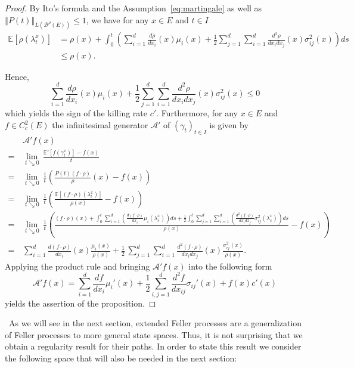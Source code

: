 \documentclass[a4paper,12pt]{article}
\theoremstyle{definition}
\theoremstyle{remark}
\numberwithin{equation}{section}
\numberwithin{theorem}{section}
\begin{document}
\begin{proof}
By Ito's formula and the Assumption~\eqref{eq:martingale} as well as
$\left\Vert P(t)\right\Vert _{L(\mathcal{\mathscr{B}}^{\rho}(E))}\leq1$,
we have for any $x\in E$ and $t\in I$
\begin{align*}
\mathbb{E}\left[\rho(\lambda_{t}^{x})\right] & =\rho(x)+\int_{0}^{t}\left({\sum}_{i=1}^{d}\frac{d\rho}{dx_{i}}(x)\mu_{i}(x)+\frac{1}{2}{\sum}_{j=1}^{d}{\sum}_{i=1}^{d}\frac{d^{2}\rho}{dx_{i}dx_{j}}(x)\sigma_{ij}^{2}(x)\right)ds\\
 & \leq\rho(x).
\end{align*}


Hence, 
\[
{\sum}_{i=1}^{d}\frac{d\rho}{dx_{i}}(x)\mu_{i}(x)+\frac{1}{2}{\sum}_{j=1}^{d}{\sum}_{i=1}^{d}\frac{d^{2}\rho}{dx_{i}dx_{j}}(x)\sigma_{ij}^{2}(x)\leq0
\]
which yields the sign of the killing rate $c'$.
 Furthermore, for any $x\in E$ and $f\in C_{c}^{2}(E)$ the infinitesimal
generator $\mathscr{A}'$ of $\left(\gamma_{t}\right)_{t\in I}$ is
given by 
\begin{align*}
& \mathscr{A}'f(x)\\
= \,& \underset{t\searrow0}{\lim}\,\frac{\mathbb{E}'\left[f(\gamma_{t}^{x})\right]-f(x)}{t}\\
 = \,& \underset{t\searrow0}{\lim}\,\frac{1}{t}\left(\frac{P\left(t\right)\left(f\cdot\rho\right)}{\rho}(x)-f(x)\right)\\
 = \,&\underset{t\searrow0}{\lim}\,\frac{1}{t}\left(\frac{\mathbb{E}\left[(f\cdot\rho)(\lambda_{t}^{x})\right]}{\rho(x)}-f(x)\right)\\
 = \,&\underset{t\searrow0}{\lim}\,\frac{1}{t}\left(\frac{(f\cdot\rho)(x)+\int_{0}^{t}{\sum}_{i=1}^{d}\left(\frac{d(f\cdot\rho)}{dx_{i}}\mu_{i}(\lambda_{s}^x)\right)ds+\frac{1}{2}\int_{0}^{t}{\sum}_{j=1}^{d}{\sum}_{i=1}^{d}\left(\frac{d^{2}(f\cdot\rho)}{dx_{i}dx_{j}}\sigma_{ij}^{2}(\lambda_{s}^x)\right)ds}{\rho(x)}-f(x)\right)\\
 = \,&{\sum}_{i=1}^{d}\frac{d(f\cdot\rho)}{dx_{i}}(x)\frac{\mu_{i}(x)}{\rho(x)}+\frac{1}{2}\,{\sum}_{j=1}^{d}{\sum}_{i=1}^{d}\frac{d^{2}(f\cdot\rho)}{dx_{i}dx_{j}}(x)\frac{\sigma_{ij}^{2}(x)}{\rho(x)}.
\end{align*}
Applying the product rule and bringing $\mathscr{A}'f(x)$ into the following form
\[
\mathscr{A}'f(x) = \sum_{i=1}^d \frac{df}{dx_i} \mu_i'(x) + \frac{1}{2}\sum_{i,j=1}^d \frac{d^2f}{dx_{ij}} \sigma_{ij}'(x) + f(x)c'(x)
\]
yields the assertion of the proposition.
\end{proof}
\
As we will see in the next section, extended Feller processes are a generalization of Feller processes to more general state spaces. Thus, it is not surprising that we obtain a regularity result for their paths.
In order to state this result we consider
the following space that will also be needed in the next section:
\end{document}
